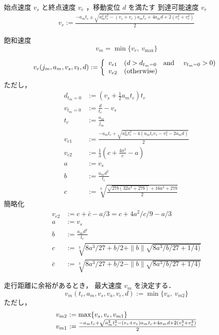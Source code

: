 \documentclass[a5paper]{ltjsarticle}
\begin{document}
始点速度 $v_s$ と終点速度 $v_e$ ，移動変位 $d$ を満たす
到達可能速度 $v_r$
\begin{align}
    v_r := \frac{-a_mt_c \pm \sqrt{a_m^2t_c^2-(v_s+v_e)a_mt_c+4a_md+2(v_s^2+v_e^2)}}{2}
\end{align}

飽和速度
$$
    v_m = \min\{v_r,~v_{\max} \}
$$

\clearpage
\begin{align}
    v_e(j_m, a_m, v_s, v_t, d) :=
    \left\{\begin{array}{ll}
        v_{e1} & (d > d_{t_m=0} \mbox{\quad and \quad} v_{t_m=0} > 0)
        \\
        v_{e2} & (\mbox{otherwise})
    \end{array}\right.
\end{align}
ただし，
\begin{align}
    d_{t_m=0} & := \left( v_s + \frac{1}{2} a_m t_c \right) t_c
    \\
    v_{t_m=0} & := \frac{d}{t_c} - v_s
    \\
    t_c       & := \frac{a_m}{j_m}
    \\
    v_{e1}    & := \frac{-a_m t_c + \sqrt{a_m^2 t_c^2-4(a_m t_c v_s - v_s^2 - 2a_m d)}}{2}
    \\
    v_{e2}    & := \frac{1}{3}\left(c +\frac{4a^2}{c} -a \right)
    \\
    a         & := v_s
    \\
    b         & := \frac{a_md^2}{t_c}
    \\
    c         & := \sqrt[3]{\frac{\sqrt{27b(32a^3+27b)} + 16a^3+27b}{2}}
\end{align}
簡略化
\begin{align}
    v_{e2}  & := c +\bar{c} - a/3 = c + 4a^2/c/9 - a/3
    \\
    a       & := v_s
    \\
    b       & := \frac{a_md^2}{t_c}
    \\
    c       & := \sqrt[3]{8a^3/27+b/2 + \|b\|\sqrt{8a^3/b/27+1/4)}}
    \\
    \bar{c} & := \sqrt[3]{8a^3/27+b/2 - \|b\|\sqrt{8a^3/b/27+1/4)}}
\end{align}

走行距離に余裕があるとき，
最大速度 $v_m$ を決定する．
$$
    v_m(t_c, a_m, v_s, v_a, v_e, d) := \min\{v_a,~v_{m2}\}
$$
ただし，
$$
    \begin{array}{l@{~}l}
        v_{m2} & := \max\{v_s, v_e, v_{m1}\}                                                   \\
        v_{m1} & := \frac{-a_mt_c + \sqrt{a_m^2t_c^2-(v_s+v_e)a_mt_c+4a_md+2(v_s^2+v_e^2)}}{2}
    \end{array}
$$
\end{document}
